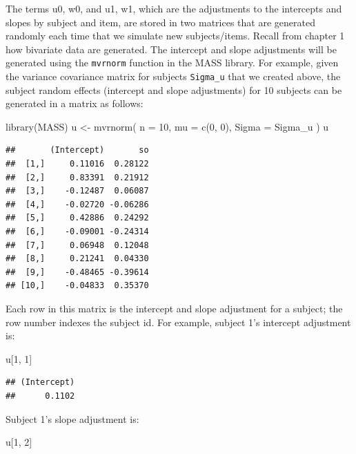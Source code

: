 \documentclass[
  12pt,
]{krantz}
\newenvironment{Shaded}{\begin{snugshade}}{\end{snugshade}}
\newcommand{\AttributeTok}[1]{\textcolor[rgb]{0.77,0.63,0.00}{#1}}
\newcommand{\DecValTok}[1]{\textcolor[rgb]{0.00,0.00,0.81}{#1}}
\newcommand{\FunctionTok}[1]{\textcolor[rgb]{0.00,0.00,0.00}{#1}}
\newcommand{\NormalTok}[1]{#1}
\newcommand{\OtherTok}[1]{\textcolor[rgb]{0.56,0.35,0.01}{#1}}
\theoremstyle{definition}
\theoremstyle{definition}
\theoremstyle{definition}
\theoremstyle{definition}
\theoremstyle{remark}
\begin{document}
The terms u0, w0, and u1, w1, which are the adjustments to the intercepts and slopes by subject and item, are stored in two matrices that are generated randomly each time that we simulate new subjects/items. Recall from chapter 1 how bivariate data are generated. The intercept and slope adjustments will be generated using the \texttt{mvrnorm} function in the MASS library. For example, given the variance covariance matrix for subjects \texttt{Sigma\_u} that we created above, the subject random effects (intercept and slope adjustments) for 10 subjects can be generated in a matrix as follows:

\begin{Shaded}
\begin{Highlighting}[]
\FunctionTok{library}\NormalTok{(MASS)}
\NormalTok{u }\OtherTok{\textless{}{-}} \FunctionTok{mvrnorm}\NormalTok{(}
  \AttributeTok{n =} \DecValTok{10}\NormalTok{,}
  \AttributeTok{mu =} \FunctionTok{c}\NormalTok{(}\DecValTok{0}\NormalTok{, }\DecValTok{0}\NormalTok{), }\AttributeTok{Sigma =}\NormalTok{ Sigma\_u}
\NormalTok{)}
\NormalTok{u}
\end{Highlighting}
\end{Shaded}

\begin{verbatim}
##       (Intercept)       so
##  [1,]     0.11016  0.28122
##  [2,]     0.83391  0.21912
##  [3,]    -0.12487  0.06087
##  [4,]    -0.02720 -0.06286
##  [5,]     0.42886  0.24292
##  [6,]    -0.09001 -0.24314
##  [7,]     0.06948  0.12048
##  [8,]     0.21241  0.04330
##  [9,]    -0.48465 -0.39614
## [10,]    -0.04833  0.35370
\end{verbatim}

Each row in this matrix is the intercept and slope adjustment for a subject; the row number indexes the subject id. For example, subject 1's intercept adjustment is:

\begin{Shaded}
\begin{Highlighting}[]
\NormalTok{u[}\DecValTok{1}\NormalTok{, }\DecValTok{1}\NormalTok{]}
\end{Highlighting}
\end{Shaded}

\begin{verbatim}
## (Intercept) 
##      0.1102
\end{verbatim}

Subject 1's slope adjustment is:

\begin{Shaded}
\begin{Highlighting}[]
\NormalTok{u[}\DecValTok{1}\NormalTok{, }\DecValTok{2}\NormalTok{]}
\end{Highlighting}
\end{Shaded}
\end{document}
